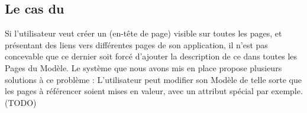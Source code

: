 \subsection{Le cas du }
Si l'utilisateur veut créer un  (en-tête de page) visible sur toutes les pages, et présentant des liens vers différentes pages de son application, il n'est pas concevable que ce dernier soit forcé d'ajouter la description de ce  dans toutes les Pages du Modèle. Le système que nous avons mis en place propose plusieurs solutions à ce problème : L'utilisateur peut modifier son Modèle de telle sorte que les pages à référencer soient mises en valeur, avec un attribut spécial par exemple. (TODO)
